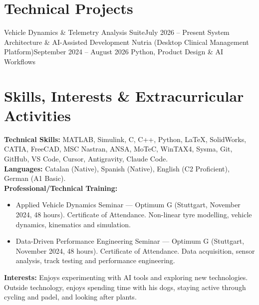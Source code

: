 \documentclass[a4paper,11pt]{article}
\begin{document}
\section{Technical Projects}
  \resumeSubHeadingListStart
    \resumeSubheading
      {Vehicle Dynamics \& Telemetry Analysis Suite}{July 2026 -- Present}
      {System Architecture \& AI-Assisted Development}{}
      \resumeItemListStart
      \resumeItemListEnd
    \resumeSubheading
      {Nutria (Desktop Clinical Management Platform)}{September 2024 -- August 2026}
      {Python, Product Design \& AI Workflows}{}
      \resumeItemListStart
      \resumeItemListEnd
  \resumeSubHeadingListEnd

\section{Skills, Interests \& Extracurricular Activities}
 \begin{itemize}[leftmargin=0.15in, label={}]
    \small{\item{
     \textbf{Technical Skills:} MATLAB, Simulink, C, C++, Python, LaTeX, SolidWorks, CATIA, FreeCAD, MSC Nastran, ANSA, MoTeC, WinTAX4, Sysma, Git, GitHub, VS Code, Cursor, Antigravity, Claude Code. \\
     \textbf{Languages:} Catalan (Native), Spanish (Native), English (C2 Proficient), German (A1 Basic). \\
     \textbf{Professional/Technical Training:}
     \begin{itemize}
        \item Applied Vehicle Dynamics Seminar --- Optimum G (Stuttgart, November 2024, 48 hours). Certificate of Attendance. Non-linear tyre modelling, vehicle dynamics, kinematics and simulation.
        \item Data-Driven Performance Engineering Seminar --- Optimum G (Stuttgart, November 2024, 48 hours). Certificate of Attendance. Data acquisition, sensor analysis, track testing and performance engineering.
     \end{itemize}
     \textbf{Interests:} Enjoys experimenting with AI tools and exploring new technologies. Outside technology, enjoys spending time with his dogs, staying active through cycling and padel, and looking after plants.
    }}
 \end{itemize}
\end{document}
